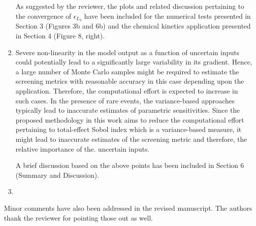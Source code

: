 \documentclass[11pt,final]{article}
\newcommand{\referee}[1]{\vspace{.1ex}\noindent{\textcolor{blue}{#1}}}
\begin{document}
\begin{enumerate}
As suggested by the reviewer, the plots and related discussion pertaining to the convergence 
of $\epsilon_{L_2}$ have been included for the numerical tests presented in Section 3 (Figures 3b
and 6b) and 
the chemical kinetics application presented in Section 4 (Figure 8, right). 


\item 
\referee{How would the proposed approach behave when presented with severe nonlinearity
or rare events where the screening metrics could misrepresent the significance
of parameters?}

Severe non-linearity in the model output as a function of uncertain inputs could potentially lead
to a significantly large variability in its gradient. Hence, a large number of Monte Carlo samples might be
required to estimate the screening metrics with reasonable accuracy in this case depending upon the
application. Therefore, the computational effort is expected to increase in such cases. In the presence
of rare events, the variance-based approaches typically lead to inaccurate estimates of 
parametric sensitivities. Since the proposed methodology in this work aims to reduce the computational
effort pertaining to total-effect Sobol index which is a variance-based measure, it might lead to
inaccurate estimates of the screening metric and therefore, the relative importance of the. uncertain
inputs.

A brief discussion based on the above points has been included in Section 6 (Summary and Discussion).

\item 
\referee{The reviewer would like to see some comments on the change of computational
cost of the proposed approach with respect to the increase of parameter dimensions.}
\end{enumerate}

Minor comments have also been addressed in the revised manuscript. The authors thank
the reviewer for pointing those out as well. 
\end{document}

